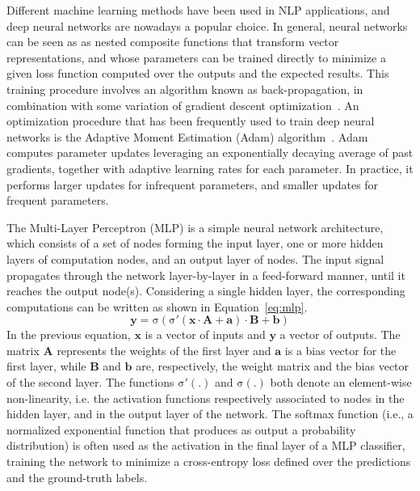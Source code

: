 Different machine learning methods have been used in NLP applications, and deep neural networks are nowadays a popular choice. In general, neural networks can be seen as as nested composite functions that transform vector representations, and whose parameters can be trained directly to minimize a given loss function computed over the outputs and the expected results. This training procedure involves an algorithm known as back-propagation, in combination with some variation of gradient descent optimization~\citep{primer}. An optimization procedure that has been frequently used to train deep neural networks is the Adaptive Moment Estimation (Adam) algorithm~\cite{kingma2014adam}. Adam computes parameter updates leveraging an exponentially decaying average of past gradients, together with adaptive learning rates for each parameter. In practice, it performs larger updates for infrequent parameters, and smaller updates for frequent parameters.

The Multi-Layer Perceptron (MLP) is a simple neural network architecture, which consists of a set of nodes forming the input layer, one or more hidden layers of computation nodes, and an output layer of nodes. The input signal propagates through the network layer-by-layer in a feed-forward manner, until it reaches the output node(s). Considering a single hidden layer, the corresponding computations can be written as shown in Equation~\ref{eq:mlp}.
\begin{equation}
\boldsymbol{y}=\mathrm{\sigma} \left( \mathrm{\sigma'}( \boldsymbol{x} \cdot \boldsymbol{A}+ \boldsymbol{a} ) \cdot \boldsymbol{B} + \boldsymbol{b} \right)
\label{eq:mlp}
\end{equation}
In the previous equation, ${\boldsymbol{x}}$ is a vector of inputs and  ${\boldsymbol{y}}$ a vector of outputs. The matrix ${\boldsymbol{A}}$ represents the weights of the first layer and ${\boldsymbol{a}}$ is a bias vector for the first layer, while ${\boldsymbol{B}}$ and ${\boldsymbol{b}}$ are, respectively, the weight matrix and the bias vector of the second layer. The functions $\mathrm{\sigma'(.)}$ and $\mathrm{\sigma(.)}$ both denote an element-wise non-linearity, i.e. the activation functions respectively associated to nodes in the hidden layer, and in the output layer of the network. The softmax function (i.e., a normalized exponential function that produces as output a probability distribution) is often used as the activation in the final layer of a MLP classifier, training the network to minimize a cross-entropy loss defined over the predictions and the ground-truth labels.

